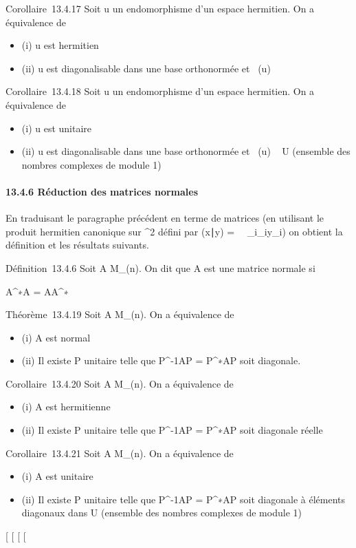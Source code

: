 \documentclass[]{article}
\begin{document}
Corollaire~13.4.17 Soit u un endomorphisme d'un espace hermitien. On a
équivalence de

\begin{itemize}
\itemsep1pt\parskip0pt
\item
  (i) u est hermitien
\item
  (ii) u est diagonalisable dans une base orthonormée et
  ~(u) \subset~ ~
\end{itemize}

Corollaire~13.4.18 Soit u un endomorphisme d'un espace hermitien. On a
équivalence de

\begin{itemize}
\itemsep1pt\parskip0pt
\item
  (i) u est unitaire
\item
  (ii) u est diagonalisable dans une base orthonormée et
  ~(u) \subset~ U
  (ensemble des nombres complexes de module 1)
\end{itemize}

\paragraph{13.4.6 Réduction des matrices normales}

En traduisant le paragraphe précédent en terme de matrices (en utilisant
le produit hermitien canonique sur ^2 défini par
(x∣y) =\
\sum ~
\_i\overlinex\_iy\_i) on
obtient la définition et les résultats suivants.

Définition~13.4.6 Soit A \in M\_(n). On dit que A est une matrice
normale si

A^∗A = AA^∗

Théorème~13.4.19 Soit A \in M\_(n). On a équivalence de

\begin{itemize}
\itemsep1pt\parskip0pt
\item
  (i) A est normal
\item
  (ii) Il existe P unitaire telle que P^-1AP =
  P^∗AP soit diagonale.
\end{itemize}

Corollaire~13.4.20 Soit A \in M\_(n). On a équivalence de

\begin{itemize}
\itemsep1pt\parskip0pt
\item
  (i) A est hermitienne
\item
  (ii) Il existe P unitaire telle que P^-1AP =
  P^∗AP soit diagonale réelle
\end{itemize}

Corollaire~13.4.21 Soit A \in M\_(n). On a équivalence de

\begin{itemize}
\itemsep1pt\parskip0pt
\item
  (i) A est unitaire
\item
  (ii) Il existe P unitaire telle que P^-1AP =
  P^∗AP soit diagonale à éléments diagonaux dans U (ensemble
  des nombres complexes de module 1)
\end{itemize}

{[}
{[}
{[}
{[}
\end{document}
